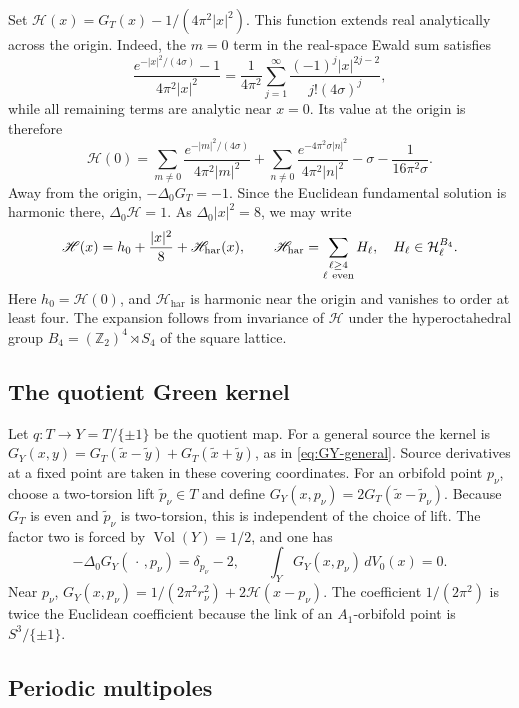 \documentclass[11pt,a4paper,twoside]{article}
\numberwithin{equation}{section}
\theoremstyle{definition}
\theoremstyle{remark}
\begin{document}
Set \(\mathscr H(x)=G_T(x)-1/(4\pi^2|x|^2)\). This function
extends real analytically across the origin. Indeed, the \(m=0\)
term in the real-space Ewald sum satisfies
\[
\frac{e^{-|x|^2/(4\sigma)}-1}{4\pi^2|x|^2}
=\frac1{4\pi^2}\sum_{j=1}^\infty
\frac{(-1)^j|x|^{2j-2}}{j!(4\sigma)^j},
\]
while all remaining terms are analytic near \(x=0\). Its value at
the origin is therefore
\[
\mathscr H(0)=\sum_{m\ne0}\frac{e^{-|m|^2/(4\sigma)}}
{4\pi^2|m|^2}
+\sum_{n\ne0}\frac{e^{-4\pi^2\sigma|n|^2}}{4\pi^2|n|^2}
-\sigma-\frac1{16\pi^2\sigma}.
\]
Away from the origin, \(-\Delta_0G_T=-1\). Since the Euclidean
fundamental solution is harmonic there, \(\Delta_0\mathscr H=1\).
As \(\Delta_0|x|^2=8\), we may write
\[
\mathscr H(x)=h_0+\frac{|x|^2}{8}+\mathscr H_{\mathrm{har}}(x),
\qquad
\mathscr H_{\mathrm{har}}=\sum_{\substack{\ell\ge4\\\ell\ {\rm even}}}
H_\ell,\quad H_\ell\in\mathcal H_\ell^{B_4}.
\]
Here \(h_0=\mathscr H(0)\), and \(\mathscr H_{\mathrm{har}}\) is
harmonic near the origin and vanishes to order at least four. The
expansion follows from invariance of \(\mathscr H\) under the
hyperoctahedral group \(B_4=(\mathbb Z_2)^4\rtimes S_4\) of the
square lattice.

\subsection{The quotient Green kernel}

Let \(q:T\to Y=T/\{\pm1\}\) be the quotient map. For a general
source the kernel is
\(G_Y(x,y)=G_T(\widetilde x-\widetilde y)
+G_T(\widetilde x+\widetilde y)\), as in \eqref{eq:GY-general}.
Source derivatives at a fixed point are taken in these covering
coordinates. For an orbifold point \(p_\nu\), choose a two-torsion
lift \(\widetilde p_\nu\in T\) and define
\(G_Y(x,p_\nu)=2G_T(\widetilde x-\widetilde p_\nu)\).
Because \(G_T\) is even and \(\widetilde p_\nu\) is two-torsion,
this is independent of the choice of lift. The factor two is forced
by \(\operatorname{Vol}(Y)=1/2\), and one has
\begin{equation}\label{app:eq:GY-equation}
-\Delta_0G_Y(\,\cdot\,,p_\nu)=\delta_{p_\nu}-2,
\qquad \int_YG_Y(x,p_\nu)\,dV_0(x)=0.
\end{equation}
Near \(p_\nu\),
\(G_Y(x,p_\nu)=1/(2\pi^2r_\nu^2)+2\mathscr H(x-p_\nu)\).
The coefficient \(1/(2\pi^2)\) is twice the Euclidean coefficient
because the link of an \(A_1\)-orbifold point is \(S^3/\{\pm1\}\).

\subsection{Periodic multipoles}
\end{document}
